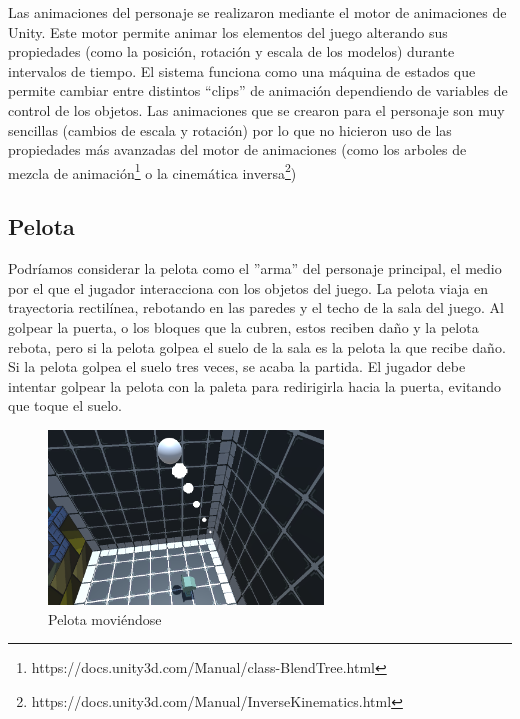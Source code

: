 Las animaciones del personaje se realizaron mediante el motor de animaciones de Unity. Este motor permite animar los elementos del juego alterando sus propiedades (como la posición, rotación y escala de los modelos) durante intervalos de tiempo. El sistema funciona como una máquina de estados que permite cambiar entre distintos ``clips'' de animación dependiendo de variables de control de los objetos. Las animaciones que se crearon para el personaje son muy sencillas (cambios de escala y rotación) por lo que no hicieron uso de las propiedades más avanzadas del motor de animaciones (como los arboles de mezcla de animación\footnote{https://docs.unity3d.com/Manual/class-BlendTree.html} o la cinemática inversa\footnote{https://docs.unity3d.com/Manual/InverseKinematics.html})

\subsection{Pelota}
Podríamos considerar la pelota como el ''arma'' del personaje principal, el medio por el que el jugador interacciona con los objetos del juego. La pelota viaja en trayectoria rectilínea, rebotando en las paredes y el techo de la sala del juego. Al golpear la puerta, o los bloques que la cubren, estos reciben daño y la pelota rebota, pero si la pelota golpea el suelo de la sala es la pelota la que recibe daño. Si la pelota golpea el suelo tres veces, se acaba la partida. El jugador debe intentar golpear la pelota con la paleta para redirigirla hacia la puerta, evitando que toque el suelo.

\begin{figure}[h]
	\includegraphics[width=0.65\textwidth]{images/estructura/fisica/ball_moving}
	\centering
	\caption{Pelota moviéndose}
\end{figure}


